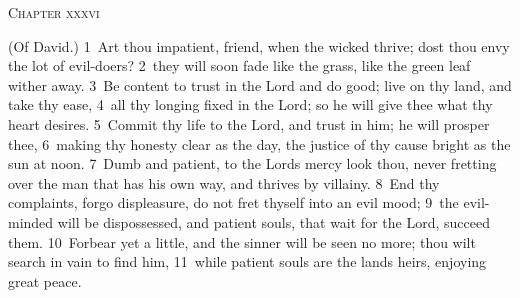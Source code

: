 \documentclass[10pt]{book} %
\begin{document}
\begin{large}\begin{center}\textsc{Chapter xxxvi}\end{center}\end{large}
(Of David.)
\textcolor{benred8}{1}~Art thou impatient, friend, when the wicked thrive; dost thou envy the lot of evil-doers? \textcolor{benred8}{2}~they will soon fade like the grass, like the green leaf wither away. \textcolor{benred8}{3}~Be content to trust in the Lord and do good; live on thy land, and take thy ease, \textcolor{benred8}{4}~all thy longing fixed in the Lord; so he will give thee what thy heart desires. \textcolor{benred8}{5}~Commit thy life to the Lord, and trust in him; he will prosper thee, \textcolor{benred8}{6}~making thy honesty clear as the day, the justice of thy cause bright as the sun at noon. \textcolor{benred8}{7}~Dumb and patient, to the Lord\textquotesingle s mercy look thou, never fretting over the man that has his own way, and thrives by villainy. \textcolor{benred8}{8}~End thy complaints, forgo displeasure, do not fret thyself into an evil mood; \textcolor{benred8}{9}~the evil-minded will be dispossessed, and patient souls, that wait for the Lord, succeed them. \textcolor{benred8}{10}~Forbear yet a little, and the sinner will be seen no more; thou wilt search in vain to find him, \textcolor{benred8}{11}~while patient souls are the land\textquotesingle s heirs, enjoying great peace.
\end{document}
